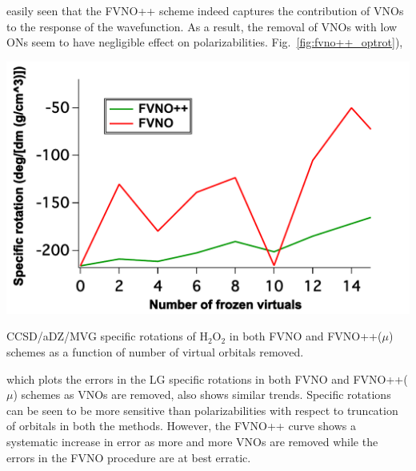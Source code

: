 easily seen that the FVNO++ scheme indeed captures the contribution of VNOs to
the response of the wavefunction. As a result, the removal of VNOs with low ONs
seem to have negligible effect on polarizabilities. Fig.~\ref{fig:fvno++_optrot}),
\begin{MyFigure}[h!]
\centering
\includegraphics[width=0.6\linewidth]{figures_fvno++/fvno++_h2o2_adz_optrot.pdf}
\caption{{\footnotesize CCSD/aDZ/MVG specific rotations of
H$_2$O$_2$ in both FVNO and FVNO++($\mu$) schemes as a function of
number of virtual orbitals removed.}}
\label{fig:fvno++_optrot}
\end{MyFigure}
which plots the errors in the LG specific rotations in both FVNO and FVNO++($\mu$) schemes as VNOs
are removed, also shows similar trends. Specific rotations can be seen to be more 
sensitive than polarizabilities with respect to truncation of orbitals in both the methods.
However, the FVNO++ curve shows a systematic increase in error as more and more VNOs are
removed while the errors in the FVNO procedure are at best erratic.




